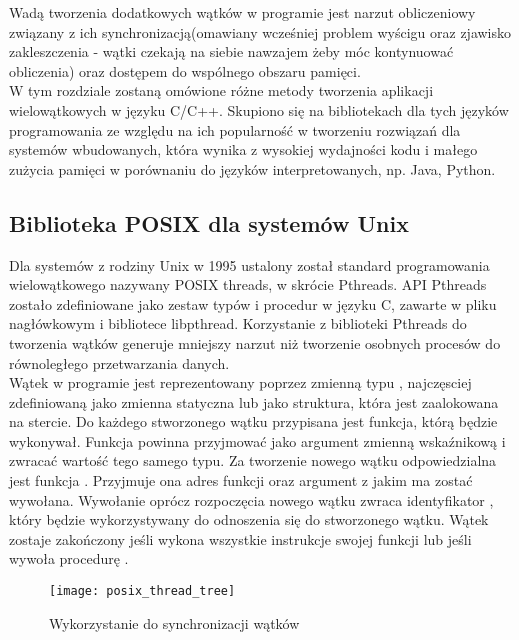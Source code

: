 \documentclass[document.tex]{subfiles}
\begin{document}
Wadą tworzenia dodatkowych wątków w programie jest narzut obliczeniowy
związany z ich synchronizacją(omawiany wcześniej problem wyścigu oraz zjawisko zakleszczenia - wątki czekają na siebie nawzajem żeby móc kontynuować obliczenia) oraz dostępem do wspólnego obszaru pamięci.\cite{POSIX_Butenhof}\cite{C++_Stroustrup} \\
\indent W tym rozdziale zostaną omówione różne metody tworzenia aplikacji
wielowątkowych w języku C/C++. Skupiono się na bibliotekach dla tych języków
programowania ze względu na ich popularność w tworzeniu rozwiązań dla systemów wbudowanych, która wynika z wysokiej wydajności kodu i małego zużycia pamięci w porównaniu do języków interpretowanych, np. Java, Python.\cite{C++_Stroustrup}\cite{C_King}

\subsection{Biblioteka POSIX dla systemów Unix}
\indent Dla systemów z rodziny Unix w 1995 ustalony został standard programowania 
wielowątkowego nazywany POSIX threads, w skrócie Pthreads. API Pthreads zostało zdefiniowane jako zestaw typów i procedur w języku C, zawarte w pliku nagłówkowym
 i bibliotece libpthread.\cite{POSIX_article}
Korzystanie z biblioteki Pthreads do tworzenia wątków generuje mniejszy narzut
niż tworzenie osobnych procesów do równoległego przetwarzania danych.\cite{POSIX_article} 
\\
\indent Wątek w programie jest reprezentowany poprzez zmienną typu , 
najczęsciej zdefiniowaną jako zmienna statyczna lub jako struktura, która jest zaalokowana na stercie.\cite{POSIX_Butenhof}\cite{POSIX_article}\cite{POSIX_tutorial} 
Do każdego stworzonego wątku przypisana jest funkcja, którą będzie wykonywał.
Funkcja powinna przyjmować jako argument zmienną wskaźnikową  i zwracać
wartość tego samego typu. Za tworzenie nowego wątku odpowiedzialna jest funkcja . Przyjmuje ona adres funkcji oraz argument z jakim ma zostać wywołana.
Wywołanie  oprócz rozpoczęcia nowego wątku zwraca identyfikator
, który będzie wykorzystywany do odnoszenia się do stworzonego wątku.
Wątek zostaje zakończony jeśli wykona wszystkie instrukcje swojej funkcji lub jeśli wywoła procedurę . \cite{POSIX_Butenhof}

\begin{figure}[h]
\texttt{[image: posix\_thread\_tree]}
\caption{Wykorzystanie  do synchronizacji wątków\protect\cite{POSIX_article}}
\label{fig:inspekcja}
\end{figure}
\end{document}
